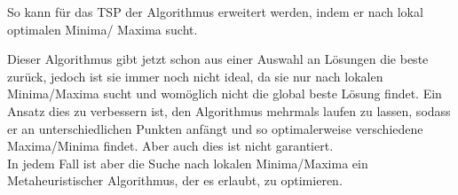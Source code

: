 \documentclass[
../AuD-Zusammenfassung.tex,
]
{subfiles}
\begin{document}
So kann für das TSP der Algorithmus erweitert werden, indem er nach lokal optimalen Minima/ Maxima sucht.
\begin{algorithm}[H]
\end{algorithm}
Dieser Algorithmus gibt jetzt schon aus einer Auswahl an Lösungen die beste zurück, jedoch ist sie immer noch nicht ideal, da sie nur nach lokalen Minima/Maxima sucht und womöglich nicht die global beste Lösung findet. Ein Ansatz dies zu verbessern ist, den Algorithmus mehrmals laufen zu lassen, sodass er an unterschiedlichen Punkten anfängt und so optimalerweise verschiedene Maxima/Minima findet. Aber auch dies ist nicht garantiert.\\
In jedem Fall ist aber die Suche nach lokalen Minima/Maxima ein Metaheuristischer Algorithmus, der es erlaubt, zu optimieren. \\

\end{document}
